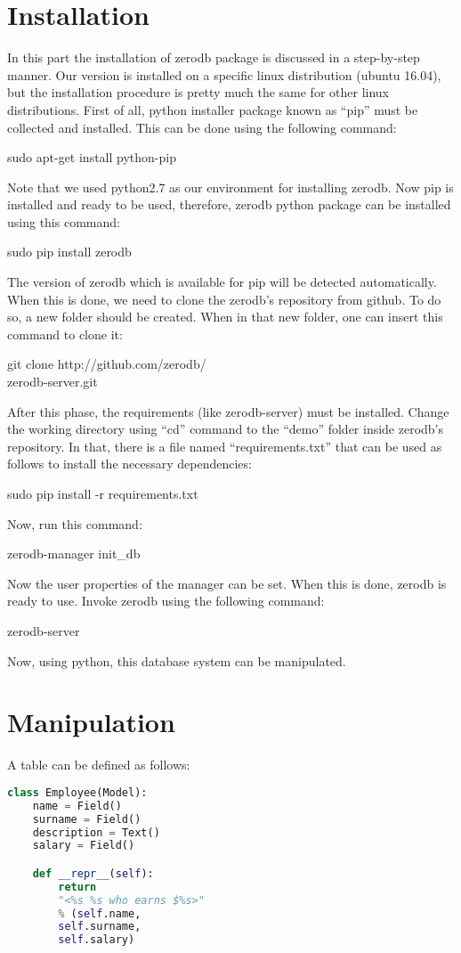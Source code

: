 \documentclass[twoside,twocolumn]{article}
\begin{document}
\section{Installation}
In this part the installation of zerodb package is discussed in a step-by-step manner. Our version is installed on a specific linux distribution (ubuntu 16.04), but the installation procedure is pretty much the same for other linux distributions. First of all, python installer package known as ``pip'' must be collected and installed. This can be done using the following command:
\begin{framed}
sudo apt-get install python-pip
\end{framed}
Note that we used python2.7 as our environment for installing zerodb. Now pip is installed and ready to be used, therefore, zerodb python package can be installed using this command:
\begin{framed}
sudo pip install zerodb
\end{framed}
The version of zerodb which is available for pip will be detected automatically. When this is done, we need to clone the zerodb's repository from github. To do so, a new folder should be created. When in that new folder, one can insert this command to clone it:
\begin{framed}
git clone http://github.com/zerodb/\\zerodb-server.git
\end{framed}
After this phase, the requirements (like zerodb-server) must be installed. Change the working directory using ``cd'' command to the  ``demo'' folder inside zerodb's repository. In that, there is a file named ``requirements.txt'' that can be used as follows to install the necessary dependencies:
\begin{framed}
sudo pip install -r requirements.txt
\end{framed}
Now, run this command:
\begin{framed}
zerodb-manager init\_db
\end{framed}
Now the user properties of the manager can be set.
When this is done, zerodb is ready to use. Invoke zerodb using the following command:
\begin{framed}
zerodb-server
\end{framed}
Now, using python, this database system can be manipulated.
\section{Manipulation}
A table can be defined as follows:
\begin{framed}
\begin{lstlisting}[language=python]
class Employee(Model):
    name = Field()
    surname = Field()
    description = Text()
    salary = Field()

    def __repr__(self):
        return 
        "<%s %s who earns $%s>" 
        % (self.name, 
        self.surname, 
        self.salary)
\end{lstlisting}
\end{framed}
\end{document}
